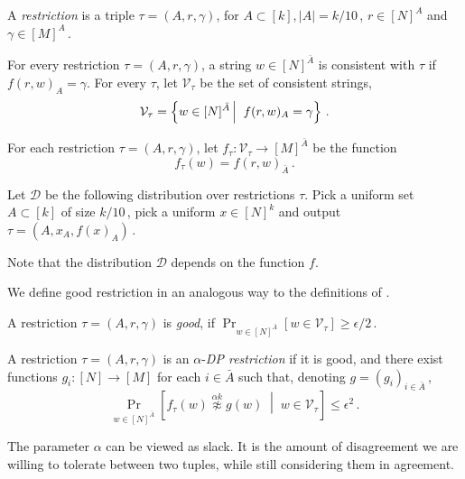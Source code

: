 \documentclass{toc}
\newcommand{\Prob}[2][]{\Pr_{{#1}}\left[#2\right]} %
\newcommand{\brac}[1]{[#1]} %
\newcommand{\abs}[1]{\lvert#1\rvert} %
\newcommand{\given}{\;\middle\vert\;} %
\newcommand\sett[2]{\left\{ #1 \left| \; \vphantom{#1 #2} \right. #2  \right\}} %
\newcommand\f{f} %
\newcommand{\g}{g} %
\newcommand\neqg[1]{\stackrel{{#1}}{ \not\approx}} %
\newcommand\cons{\mathcal{V}} %
\newcommand\rest[1]{{\bar{#1}}}  %
\begin{document}
\begin{definition}[Restriction]
A \emph{restriction} is a triple $\tau = (A,r,\gamma)$, for $A\subset[k],\abs{A}=k/10$\,, $r\in[N]^A$ and $\gamma\in[M]^A$\,.
\end{definition}
%
\begin{definition}
	For every restriction $\tau = (A,r,\gamma)$, a string $w\in[N]^{\rest{A}}$ is consistent with $\tau$ if $ \f(r,w)_A =\gamma $.
	For every $\tau$, let $\cons_{\tau}$ be the set of consistent strings,
	\[\cons_{\tau} = \sett{ w\in[N]^{\rest{A}}}{  \f(r,w)_A =\gamma }\,.\] %
\end{definition}
%
\begin{definition}
	For each restriction $\tau = (A,r,\gamma)$, let $f_{\tau}:\cons_\tau\rightarrow[M]^{\bar{A}}$ be the function
	\[f_{\tau}(w) = \f(r,w)_\rest{A}\,.\] %
\end{definition}

\begin{definition}\label{def:distribution}
	Let $\mathcal{D}$ be the following distribution over restrictions $\tau$. Pick a uniform set $A\subset[k]$ of size $k/10$\,, pick a uniform $x\in[N]^k$ and output $\tau = (A,x_A,\f(x)_A)$\,.
\end{definition}
Note that the distribution $\mathcal{D}$ depends on the function $f$.

We define good restriction in an analogous way to the definitions of \cite{impagliazzo2012new}. 

\begin{definition}\label{def:good rest}
	A restriction $\tau = (A,r,\gamma)$ is \emph{good}, if $ \Pr_{w\in[N]^{\rest{A}}}[w\in \cons_{\tau}] \geq 
	\epsilon/2$\,. %
\end{definition}

\begin{definition}\label{def:DP rest}
	A restriction $\tau = (A,r,\gamma)$ is an $\alpha$-\emph{DP restriction} if it is good, and there exist functions $\g_i:[N]\rightarrow[M]$ for each $i\in \bar A$ such that, denoting $g = (g_i)_{i\in \bar A}$\,, 
	\[	\Prob[w\in\brac{N}^{\rest{A}}]{\f_\tau(w) \neqg{\alpha k} \g(w) \given w\in\mathcal{V}_\tau} \leq \epsilon^{2 }\,.\] %
\end{definition}
\begin{remark}
The parameter $\alpha$ can be viewed as slack. It is the amount of disagreement we are willing to tolerate between two tuples, while still considering them in agreement.
\end{remark}
\end{document}

